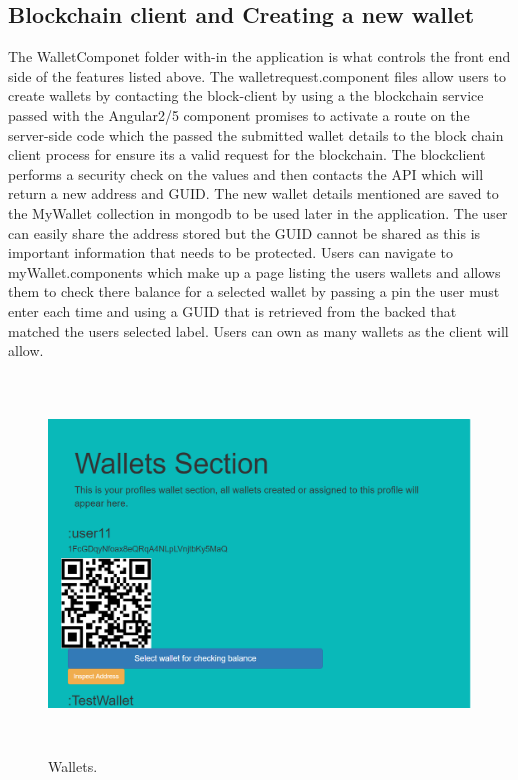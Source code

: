 \subsection{Blockchain client and Creating a new wallet}
The WalletComponet folder with-in the application is what controls the front end side of the features listed above. The walletrequest.component files allow users to create wallets by contacting the block-client by using a the blockchain service passed with the Angular2/5 component promises to activate a route on the server-side code which the passed the submitted wallet details to the block chain client process for ensure its a valid request for the blockchain. The blockclient performs a security check on the values and then contacts the API which will return a new address and GUID. The new wallet details mentioned are saved to the MyWallet collection in mongodb to be used later in the application. The user can easily share the address stored but the GUID cannot be shared as this is important information that needs to be protected. Users can navigate to myWallet.components which make up a page listing the users wallets and allows them to check there balance for a selected wallet by passing a pin the user must enter each time and using a GUID that is retrieved from the backed that matched the users selected label. Users can own as many wallets as the client will allow.

\begin{figure}[H]
\centering
\includegraphics[width=16cm, height=10cm]{img/wallets.png}
\caption{Wallets.}
\end{figure}

